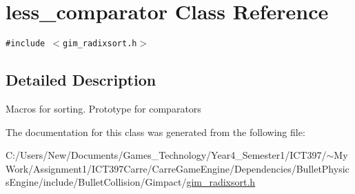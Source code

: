 \hypertarget{classless__comparator}{
\section{less\_\-comparator Class Reference}
\label{classless__comparator}
}
{\tt \#include $<$gim\_\-radixsort.h$>$}



\subsection{Detailed Description}
Macros for sorting. Prototype for comparators 

The documentation for this class was generated from the following file:\begin{CompactItemize}
\item 
C:/Users/New/Documents/Games\_\-Technology/Year4\_\-Semester1/ICT397/$\sim$My Work/Assignment1/ICT397Carre/CarreGameEngine/Dependencies/BulletPhysicsEngine/include/BulletCollision/Gimpact/\hyperlink{gim__radixsort_8h}{gim\_\-radixsort.h}\end{CompactItemize}
